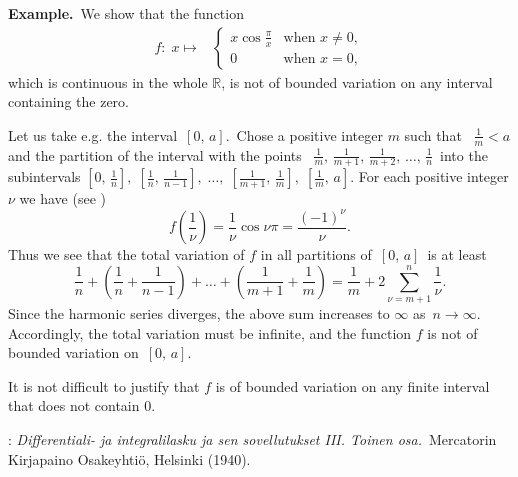 \documentclass[12pt]{article}
\theoremstyle{definition}
\begin{document}
\textbf{Example.}\, We show that the function
\begin{eqnarray*}
 f\!:\; x\mapsto\! & \left\{ \begin {array}{ll} x\cos\frac{\pi}{x} & \mbox{when}\,\,x \neq 0,\\
 0 & \mbox{when}\,\, x = 0,
 \end{array} \right.
 \end{eqnarray*}
which is continuous in the whole $\mathbb{R}$, is not of bounded variation on any interval containing the zero.

Let us take e.g. the interval \,$[0,\,a]$.\, Chose a positive integer $m$ such that \, $\frac{1}{m} < a$ and the partition of the interval with the points \, $\frac{1}{m},\, \frac{1}{m+1},\,\frac{1}{m+2},\, \ldots,\, \frac{1}{n}$\, into the subintervals
$[0,\,\frac{1}{n}],\; [\frac{1}{n},\,\frac{1}{n-1}],\;\ldots,\; [\frac{1}{m+1},\,\frac{1}{m}],\; [\frac{1}{m},\,a]$.\; For each positive integer $\nu$ we have (see )
$$f\left(\frac{1}{\nu}\right) = \frac{1}{\nu}\cos\nu\pi = \frac{(-1)^\nu}{\nu}.$$
Thus we see that the total variation of $f$ in all partitions of \,$[0,\,a]$\, is at least
$$\frac{1}{n}\!+\!\left(\frac{1}{n}\!+\!\frac{1}{n\!-\!1}\right)\!+\ldots+\!\left(\frac{1}{m\!+\!1}+\frac{1}{m}\right)
= \frac{1}{m}+2\!\sum_{\nu=m+1}^n\frac{1}{\nu}.$$
Since the harmonic series diverges, the above sum increases to $\infty$ as\, $n\to\infty$.\, Accordingly, the total variation must be infinite, and the function $f$ is not of bounded variation on\, $[0,\,a]$.

It is not difficult to justify that $f$ is of bounded variation on any finite interval that does not contain 0.

\begin{thebibliography}{8}
: {\em Differentiali- ja integralilasku
ja sen sovellutukset III. Toinen osa.}\, Mercatorin Kirjapaino Osakeyhti\"o, Helsinki (1940).
\end{thebibliography}
\end{document}

